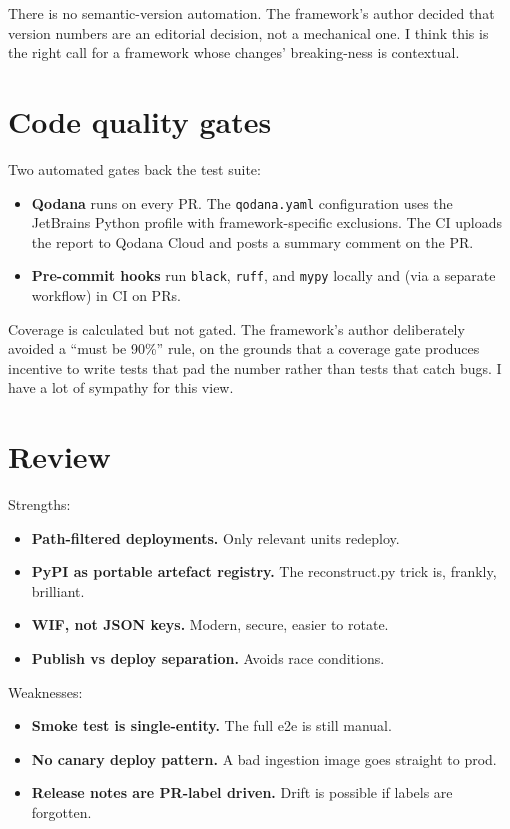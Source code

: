 \documentclass[
  11pt,
  british,
  oneside]{book}
\providecommand{\tightlist}{%
  \setlength{\itemsep}{0pt}\setlength{\parskip}{0pt}}
\begin{document}
There is no semantic-version automation. The framework's author decided
that version numbers are an editorial decision, not a mechanical one. I
think this is the right call for a framework whose changes'
breaking-ness is contextual.

\hypertarget{code-quality-gates}{%
\section{Code quality gates}\label{code-quality-gates}}

Two automated gates back the test suite:

\begin{itemize}
\tightlist
\item
  \textbf{Qodana} runs on every PR. The \texttt{qodana.yaml}
  configuration uses the JetBrains Python profile with
  framework-specific exclusions. The CI uploads the report to Qodana
  Cloud and posts a summary comment on the PR.
\item
  \textbf{Pre-commit hooks} run \texttt{black}, \texttt{ruff}, and
  \texttt{mypy} locally and (via a separate workflow) in CI on PRs.
\end{itemize}

Coverage is calculated but not gated. The framework's author
deliberately avoided a ``must be 90\%'' rule, on the grounds that a
coverage gate produces incentive to write tests that pad the number
rather than tests that catch bugs. I have a lot of sympathy for this
view.

\hypertarget{review-3}{%
\section{Review}\label{review-3}}

Strengths:

\begin{itemize}
\tightlist
\item
  \textbf{Path-filtered deployments.} Only relevant units redeploy.
\item
  \textbf{PyPI as portable artefact registry.} The reconstruct.py trick
  is, frankly, brilliant.
\item
  \textbf{WIF, not JSON keys.} Modern, secure, easier to rotate.
\item
  \textbf{Publish vs deploy separation.} Avoids race conditions.
\end{itemize}

Weaknesses:

\begin{itemize}
\tightlist
\item
  \textbf{Smoke test is single-entity.} The full e2e is still manual.
\item
  \textbf{No canary deploy pattern.} A bad ingestion image goes straight
  to prod.
\item
  \textbf{Release notes are PR-label driven.} Drift is possible if
  labels are forgotten.
\end{itemize}
\end{document}
